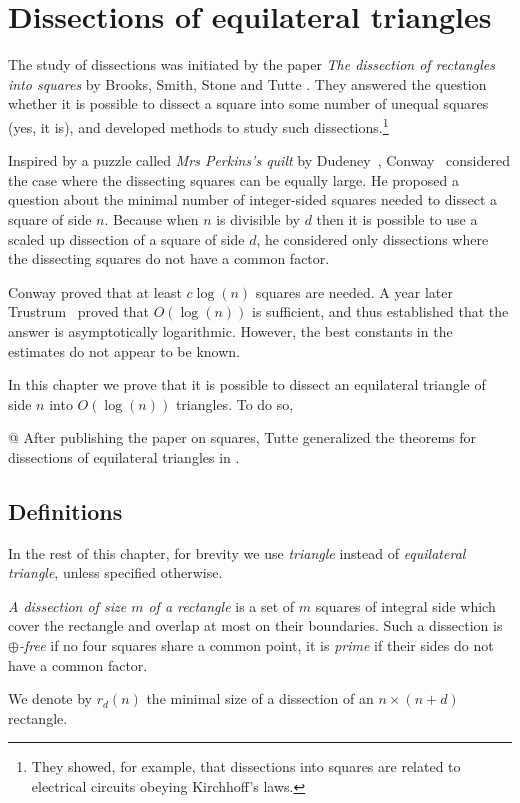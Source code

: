 \chapter{Dissections of equilateral triangles}
\label{chap:dissections}

The study of dissections was initiated by the paper \emph{The dissection of rectangles into squares} by Brooks, Smith, Stone and Tutte \cite{BrooksSmithStoneTutte40}. They answered the question whether it is possible to dissect a square into some number of unequal squares (yes, it is), and developed methods to study such dissections.\footnote{They showed, for example, that dissections into squares are related to electrical circuits obeying Kirchhoff's laws.}

Inspired by a puzzle called \emph{Mrs Perkins's quilt} by Dudeney~\cite{Dudeney17}, Conway~\cite{Conway64} considered the case where the dissecting squares can be equally large. He proposed a question about the minimal number of integer-sided squares needed to dissect a square of side $n$. Because when $n$ is divisible by $d$ then it is possible to use a scaled up dissection of a square of side $d$, he considered only dissections where the dissecting squares do not have a common factor.

Conway proved that at least $c \log(n)$ squares are needed. A year later Trustrum~\cite{Trustrum65} proved that $O(\log(n))$ is sufficient, and thus established that the answer is asymptotically logarithmic. However, the best constants in the estimates do not appear to be known.

\bigskip

In this chapter we prove that it is possible to dissect an equilateral triangle of side $n$ into $O(\log(n))$ triangles. To do so, 

@ After publishing the paper \cite{BrooksSmithStoneTutte40} on squares, Tutte generalized the theorems for dissections of equilateral triangles in \cite{Tutte48}. 


\section{Definitions}

In the rest of this chapter, for brevity we use \emph{triangle} instead of \emph{equilateral triangle}, unless specified otherwise.

\begin{defn}
\emph{A dissection of size $m$ of a rectangle} is a set of $m$ squares of integral side which cover the rectangle and overlap at most on their boundaries. Such a dissection is \emph{$\oplus$-free} if no four squares share a common point, it is \emph{prime} if their sides do not have a common factor.

We denote by $r_d(n)$ the minimal size of a dissection of an $n \times (n+d)$ rectangle.
\end{defn}

